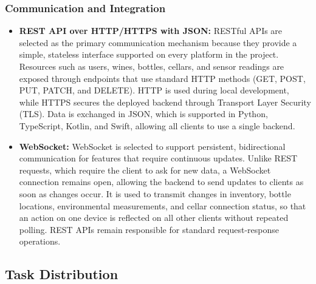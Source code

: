 \documentclass[conference]{IEEEtran}
\begin{document}
\subsubsection{Communication and Integration}
\begin{itemize}
    \item \textbf{REST API over HTTP/HTTPS with JSON:} RESTful APIs are selected as the primary communication mechanism because they provide a simple, stateless interface supported on every platform in the project. Resources such as users, wines, bottles, cellars, and sensor readings are exposed through endpoints that use standard HTTP methods (GET, POST, PUT, PATCH, and DELETE). HTTP is used during local development, while HTTPS secures the deployed backend through Transport Layer Security (TLS). Data is exchanged in JSON, which is supported in Python, TypeScript, Kotlin, and Swift, allowing all clients to use a single backend.
    \item \textbf{WebSocket:} WebSocket is selected to support persistent, bidirectional communication for features that require continuous updates. Unlike REST requests, which require the client to ask for new data, a WebSocket connection remains open, allowing the backend to send updates to clients as soon as changes occur. It is used to transmit changes in inventory, bottle locations, environmental measurements, and cellar connection status, so that an action on one device is reflected on all other clients without repeated polling. REST APIs remain responsible for standard request-response operations.
\end{itemize}

\subsection{Task Distribution}
\end{document}
